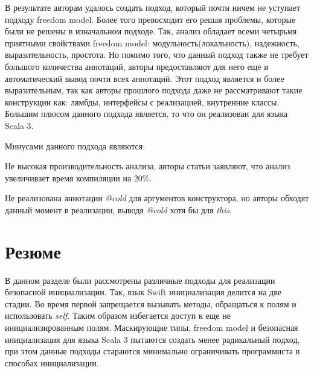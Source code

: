 В результате авторам удалось создать подход, который почти ничем не уступает подходу freedom model.
Более того превосходит его решая проблемы, которые были не решены в изначальном подходе.
Так, анализ обладает всеми четырьмя приятными свойствами freedom model: модульность(локальность), надежность, выразительность, простота.
Но помимо того, что данный подход также не требует большого количества аннотаций,
авторы предоставляют для него еще и автоматический вывод почти всех аннотаций.
Этот подход является и более выразительным, так как авторы прошлого подхода даже не рассматривают такие конструкции как:
лямбды, интерфейсы с реализацией, внутренние классы.
Большим плюсом данного подхода является, то что он реализован для языка Scala 3.

Минусами данного подхода являются:
\begin{itemize*}
    \item Не высокая производительность анализа, авторы статьи заявляют, что анализ увеличивает время компиляции на 20\%.
    \item Не реализована аннотации \emph{@cold} для аргументов конструктора,
    но авторы обходят данный момент в реализации, выводя \emph{@cold} хотя бы для \emph{this}.
\end{itemize*}

\section{Резюме}\label{sec:обзор-резюме}

В данном разделе были рассмотрены различные подходы для реализации безопасной инициализации.
Так, язык Swift инициализация делится на две стадии.
Во время первой запрещается вызывать методы, обращаться к полям и использовать \emph{self}.
Таким образом избегается доступ к еще не инициализированным полям.
Маскирующие типы, freedom model и безопасная инициализация для языка Scala 3 пытаются создать менее радикальный подход,
при этом данные подходы стараются минимально ограничивать программиста в способах инициализации.

